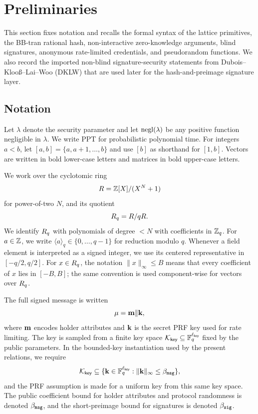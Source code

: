 \section{Preliminaries}
\label{sec:preliminaries}

This section fixes notation and recalls the formal syntax of the lattice primitives, the BB-tran rational hash,
non-interactive zero-knowledge arguments, blind signatures, anonymous rate-limited credentials, and
pseudorandom functions.  We also record the imported non-blind signature-security statements from
Dubois--Kloo\ss--Lai--Woo (DKLW) that are used later for the hash-and-preimage signature layer.

\subsection{Notation}
Let $\lambda$ denote the security parameter and let $\mathrm{negl}(\lambda)$ be any positive function negligible in
$\lambda$.  We write PPT for probabilistic polynomial time.  For integers $a<b$, let
$[a,b]=\{a,a+1,\ldots,b\}$ and use $[b]$ as shorthand for $[1,b]$.  Vectors are written in bold lower-case
letters and matrices in bold upper-case letters.

We work over the cyclotomic ring
\[
  R=\mathbb{Z}[X]/(X^N+1)
\]
for power-of-two $N$, and its quotient
\[
  R_q=R/qR.
\]
We identify $R_q$ with polynomials of degree $<N$ with coefficients in $\mathbb{Z}_q$.  For $a\in\mathbb{Z}$, we write
$\langle a\rangle_q\in\{0,\ldots,q-1\}$ for reduction modulo $q$.  Whenever a field element is interpreted as a
signed integer, we use its centered representative in $[-q/2,q/2]$.  For $x\in R_q$, the notation
$\|x\|_\infty\le B$ means that every coefficient of $x$ lies in $[-B,B]$; the same convention is used
component-wise for vectors over $R_q$.

The full signed message is written
\[
  \mathbf{\mu}=\mathbf{m}\Vert \mathbf{k},
\]
where $\mathbf{m}$ encodes holder attributes and $\mathbf{k}$ is the secret PRF key used for rate limiting.  The key
is sampled from a finite key space $\mathcal K_{\mathsf{key}}\subseteq \mathbb{F}_q^{\ell_{\mathsf{key}}}$ fixed by the
public parameters.  In the bounded-key instantiation used by the present relations, we require
\[
  \mathcal K_{\mathsf{key}}\subseteq
  \{\mathbf{k}\in\mathbb{F}_q^{\ell_{\mathsf{key}}}:\|\mathbf{k}\|_\infty\le \beta_{\mathtt{msg}}\},
\]
and the PRF assumption is made for a uniform key from this same key space.  The public coefficient bound
for holder attributes and protocol randomness is denoted $\beta_{\mathtt{msg}}$, and the short-preimage bound for
signatures is denoted $\beta_{\mathtt{sig}}$.

